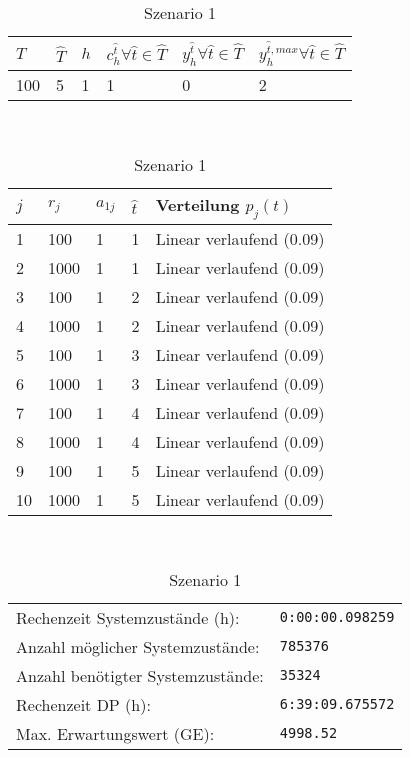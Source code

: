 \begin{table}[h!]
\renewcommand{\arraystretch}{1.5}
  \begin{center}
    \caption{Szenario 1}  \label{S1}
    \vspace*{3mm}
    \begin{tabular}{l l l l l l}   %
    $T$ & $\hat T$  & $h$ & $c_h^{\hat t}\forall \hat{t}\in{\hat T}$ & $y_h^{\hat t}\forall \hat{t}\in{\hat T}$  & $y_h^{{\hat t},max}\forall \hat{t}\in{\hat T}$  \\  \hline
100 & 5 & 1 & 1 & 0 & 2  \\ \hline
    \end{tabular} \\[3mm]
        \begin{tabular}{p{1cm} p{1cm} p{1cm}  p{1cm} p{6cm}}   %
    $j$ & $r_j$  & $a_{1j}$ & $\hat t$ & Verteilung $p_j(t)$ \\  \hline
1 & 100 & 1 & 1 & Linear verlaufend (0.09)   \\
2 & 1000 & 1 & 1 & Linear verlaufend (0.09)  \\
3 & 100 & 1 & 2 & Linear verlaufend (0.09)  \\
4 & 1000 & 1 & 2 & Linear verlaufend (0.09)  \\
5 & 100 & 1 & 3 & Linear verlaufend (0.09)  \\
6 & 1000 & 1 & 3 & Linear verlaufend (0.09)  \\
7 & 100 & 1 & 4 & Linear verlaufend (0.09)  \\
8 & 1000 & 1 & 4 & Linear verlaufend (0.09)  \\
9 & 100 & 1 & 5 & Linear verlaufend (0.09)  \\
10 & 1000 & 1 & 5 & Linear verlaufend (0.09)  \\ \hline
    \end{tabular} \\[3mm]
     \begin{tabular}{p{7cm}p{5cm}} \hline
     Rechenzeit Systemzustände (h): & \texttt{0:00:00.098259} \\
     Anzahl möglicher Systemzustände: & \texttt{785376} \\
     Anzahl benötigter Systemzustände: & \texttt{35324} \\ 
     Rechenzeit DP (h): & \texttt{6:39:09.675572} \\ 
          Max. Erwartungswert (GE): & \texttt{4998.52} \\ \hline
         \end{tabular} \\[3mm]
  \end{center}
\end{table}


